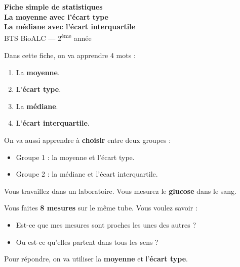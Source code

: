 \documentclass[12pt,a4paper]{article}
\title{}
\author{}
\date{}
\begin{document}

\begin{center}
  {\Large \textbf{Fiche simple de statistiques}}\\[0.3cm]
  {\large \textbf{La moyenne avec l'écart type}}\\[0.2cm]
  {\large \textbf{La médiane avec l'écart interquartile}}\\[0.4cm]
  {\large BTS BioALC — 2\textsuperscript{ème} année}
\end{center}

\vspace{0.4cm}

\begin{objectif}
Dans cette fiche, on va apprendre 4 mots :

\vspace{0.2cm}
\begin{enumerate}[leftmargin=*]
  \item La \textbf{moyenne}.
  \item L'\textbf{écart type}.
  \item La \textbf{médiane}.
  \item L'\textbf{écart interquartile}.
\end{enumerate}

\vspace{0.2cm}
On va aussi apprendre à \textbf{choisir} entre deux groupes :

\vspace{0.2cm}
\begin{itemize}[leftmargin=*]
  \item Groupe 1 : la moyenne et l'écart type.
  \item Groupe 2 : la médiane et l'écart interquartile.
\end{itemize}
\end{objectif}

\vspace{0.4cm}

\begin{histoire}
Vous travaillez dans un laboratoire. Vous mesurez le \textbf{glucose} dans le sang.

Vous faites \textbf{8 mesures} sur le même tube. Vous voulez savoir :

\vspace{0.2cm}
\begin{itemize}[leftmargin=*]
  \item Est-ce que mes mesures sont proches les unes des autres ?
  \item Ou est-ce qu'elles partent dans tous les sens ?
\end{itemize}

\vspace{0.2cm}
Pour répondre, on va utiliser la \textbf{moyenne} et l'\textbf{écart type}.
\end{histoire}
\end{document}
